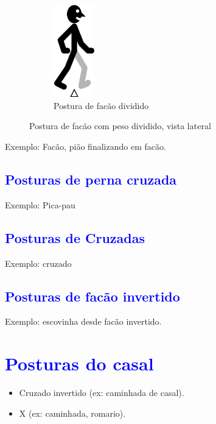 \begin{figure}[H]
    \centering
    \begin{subfigure}[b]{0.3\textwidth}
        \includegraphics[height=4cm]{chapters/cap-partituramov-posturas/postura-facao-dividido-esq.eps}
        \caption{Postura de facão dividido}
        \label{fig:facaodivididoesq}
    \end{subfigure}
    \caption{Postura de facão com peso dividido, vista lateral}\label{fig:facaodividido}
\end{figure}

Exemplo: Facão, pião finalizando em facão.

\subsection{\textcolor{blue}{ Posturas de perna cruzada }}
Exemplo: Pica-pau


\subsection{\textcolor{blue}{ Posturas de Cruzadas }}
Exemplo: cruzado

\subsection{\textcolor{blue}{ Posturas de facão invertido}}

Exemplo: escovinha desde facão invertido.


\section{\textcolor{blue}{Posturas do casal}}

\begin{itemize}
\item Cruzado invertido (ex: caminhada de casal).
\item X (ex: caminhada, romario).
\end{itemize}

